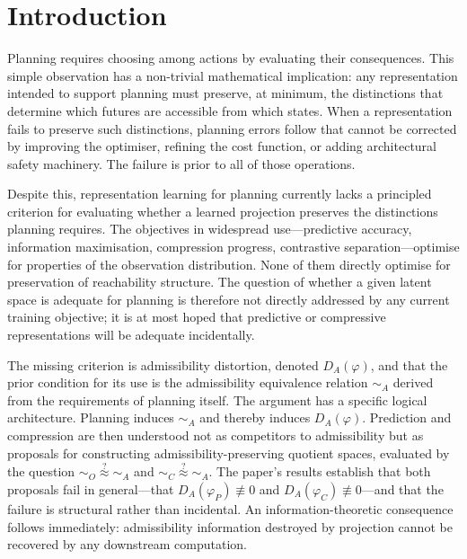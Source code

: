 \documentclass[11pt, a4paper]{article}
\theoremstyle{plain}
\theoremstyle{definition}
\theoremstyle{remark}
\newcommand{\simA}{\sim_A}
\newcommand{\simO}{\sim_O}
\newcommand{\simC}{\sim_C}
\newcommand{\DA}{D_A(\varphi)}
\begin{document}
\section{Introduction}

Planning requires choosing among actions by evaluating their consequences. This
simple observation has a non-trivial mathematical implication: any representation
intended to support planning must preserve, at minimum, the distinctions that
determine which futures are accessible from which states. When a representation
fails to preserve such distinctions, planning errors follow that cannot be
corrected by improving the optimiser, refining the cost function, or adding
architectural safety machinery. The failure is prior to all of those operations.

Despite this, representation learning for planning currently lacks a principled
criterion for evaluating whether a learned projection preserves the distinctions
planning requires. The objectives in widespread use---predictive accuracy,
information maximisation, compression progress, contrastive separation---optimise
for properties of the observation distribution. None of them directly optimise
for preservation of reachability structure. The question of whether a given
latent space is adequate for planning is therefore not directly addressed by
any current training objective; it is at most hoped that predictive or compressive
representations will be adequate incidentally.

The missing criterion is admissibility distortion, denoted
$\DA$, and that the prior condition for its use is the admissibility equivalence
relation $\simA$ derived from the requirements of planning itself. The argument
has a specific logical architecture. Planning induces $\simA$ and thereby induces
$\DA$. Prediction and compression are then understood not as competitors to
admissibility but as proposals for constructing admissibility-preserving quotient
spaces, evaluated by the question $\simO \stackrel{?}{\approx} \simA$ and
$\simC \stackrel{?}{\approx} \simA$. The paper's results establish that both
proposals fail in general---that $D_A(\varphi_P) \not\equiv 0$ and
$D_A(\varphi_C) \not\equiv 0$---and that the failure is structural rather than
incidental. An information-theoretic consequence follows immediately: admissibility
information destroyed by projection cannot be recovered by any downstream
computation.
\end{document}
